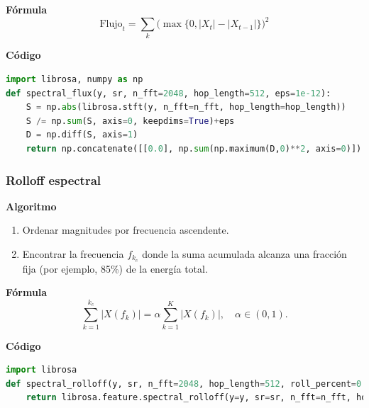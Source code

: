 \textbf{Fórmula}
\[
\text{Flujo}_t=\sum_k\big(\max\{0, |X_t|-|X_{t-1}|\}\big)^2
\]

\textbf{Código}
\begin{lstlisting}[language=Python, label={lst:flux_code}, caption={Flujo espectral}]
import librosa, numpy as np
def spectral_flux(y, sr, n_fft=2048, hop_length=512, eps=1e-12):
    S = np.abs(librosa.stft(y, n_fft=n_fft, hop_length=hop_length))
    S /= np.sum(S, axis=0, keepdims=True)+eps
    D = np.diff(S, axis=1)
    return np.concatenate([[0.0], np.sum(np.maximum(D,0)**2, axis=0)])
\end{lstlisting}

\subsubsection{Rolloff espectral}
\textbf{Algoritmo} \parencite{tzanetakis2002musical, peeters2004large}
\begin{enumerate}
    \item Ordenar magnitudes por frecuencia ascendente.
    \item Encontrar la frecuencia \(f_{k_c}\) donde la suma acumulada alcanza una fracción fija (por ejemplo, 85\%) de la energía total.
\end{enumerate}

\textbf{Fórmula}
\[
\sum_{k=1}^{k_c}|X(f_k)|=\alpha\sum_{k=1}^{K}|X(f_k)|,\quad \alpha\in(0,1).
\]

\textbf{Código}
\begin{lstlisting}[language=Python, label={lst:rolloff_code}, caption={Rolloff espectral}]
import librosa
def spectral_rolloff(y, sr, n_fft=2048, hop_length=512, roll_percent=0.85):
    return librosa.feature.spectral_rolloff(y=y, sr=sr, n_fft=n_fft, hop_length=hop_length, roll_percent=roll_percent)[0]
\end{lstlisting}

